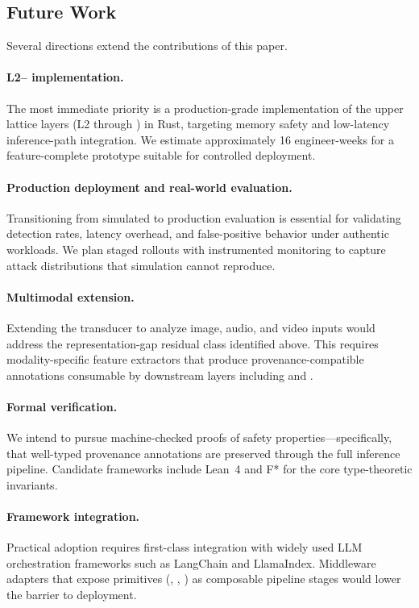 \subsection{Future Work}
\label{sec:future-work}

Several directions extend the contributions of this paper.

\paragraph{L2--\mire{} implementation.}
The most immediate priority is a production-grade implementation of the
upper lattice layers (L2 through \mire{}) in Rust, targeting memory
safety and low-latency inference-path integration.  We estimate
approximately 16 engineer-weeks for a feature-complete prototype
suitable for controlled deployment.

\paragraph{Production deployment and real-world evaluation.}
Transitioning from simulated to production evaluation is essential for
validating detection rates, latency overhead, and false-positive
behavior under authentic workloads.  We plan staged rollouts with
instrumented monitoring to capture attack distributions that simulation
cannot reproduce.

\paragraph{Multimodal extension.}
Extending the \pasr{} transducer to analyze image, audio, and video
inputs would address the representation-gap residual class identified
above.  This requires modality-specific feature extractors that produce
provenance-compatible annotations consumable by downstream layers
including \tsa{} and \gps{}.

\paragraph{Formal verification.}
We intend to pursue machine-checked proofs of \tsa{} safety
properties---specifically, that well-typed provenance annotations are
preserved through the full inference pipeline.  Candidate frameworks
include Lean~4 and F* for the core type-theoretic invariants.

\paragraph{Framework integration.}
Practical adoption requires first-class integration with widely used
LLM orchestration frameworks such as LangChain and LlamaIndex.
Middleware adapters that expose \sentinel{} primitives (\asra{},
\tcsa{}, \pasr{}) as composable pipeline stages would lower the
barrier to deployment.


